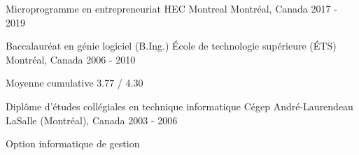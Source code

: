 
\begin{cventries}

  \cventry
    {Microprogramme en entrepreneuriat} %
    {HEC Montreal} %
    {Montréal, Canada} %
    {2017 - 2019} %
    {}

  \cventry
    {Baccalauréat en génie logiciel (B.Ing.)} %
    {École de technologie supérieure (ÉTS)} %
    {Montréal, Canada} %
    {2006 - 2010} %
    {
      \begin{cvitems} %
        \item {Moyenne cumulative 3.77 / 4.30}
      \end{cvitems}
    }

  \cventry
    {Diplôme d’études collégiales en technique informatique} %
    {Cégep André-Laurendeau} %
    {LaSalle (Montréal), Canada} %
    {2003 - 2006} %
    {
      \begin{cvitems} %
        \item {Option informatique de gestion}
      \end{cvitems}
    }

\end{cventries}